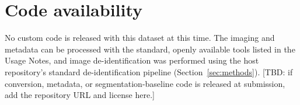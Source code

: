 
\section*{Code availability}\label{sec:code}

No custom code is released with this dataset at this time.
The imaging and metadata can be processed with the standard, openly available tools listed in the Usage Notes, and image de-identification was performed using the host repository's standard de-identification pipeline (Section~\ref{sec:methods}).
[TBD: if conversion, metadata, or segmentation-baseline code is released at submission, add the repository URL and license here.]
